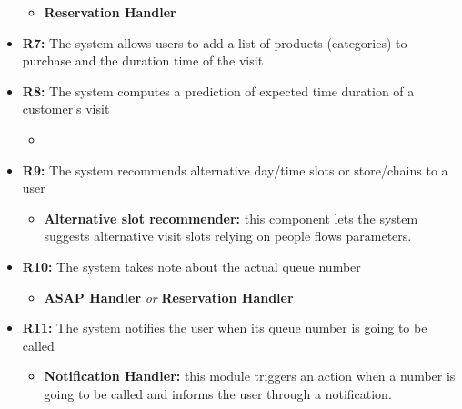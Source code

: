 \documentclass[table, 12pt]{article}
\begin{document}
\begin{itemize}
          \begin{itemize}
              \item \textbf{Reservation Handler}
          \end{itemize}
    \item \textbf{R7:} The system allows users to add a list of products (categories) to purchase and the duration time of the visit
    \item \textbf{R8:} The system computes a prediction of expected time duration of a customer's visit
          \begin{itemize}
              \item \textbf{}
          \end{itemize}
    \item \textbf{R9:} The system recommends alternative day/time slots or store/chains to a user
          \begin{itemize}
              \item \textbf{Alternative slot recommender:} this component lets the system suggests alternative visit slots relying on people flows parameters.
          \end{itemize}
    \item \textbf{R10:} The system takes note about the actual queue number
          \begin{itemize}
              \item \textbf{ASAP Handler} \textit{or} \textbf{Reservation Handler}
          \end{itemize}
    \item \textbf{R11:} The system notifies the user when its queue number is going to be called
          \begin{itemize}
              \item \textbf{Notification Handler:} this module triggers an action when a number is going to be called and informs the user through a notification.
          \end{itemize}
\end{itemize}
\end{document}
